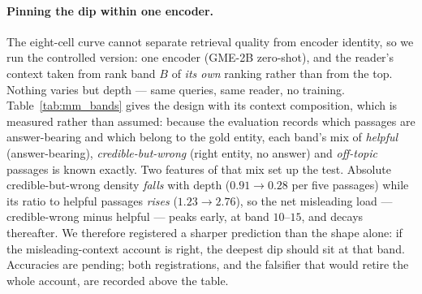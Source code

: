 %

\paragraph{Pinning the dip within one encoder.} The eight-cell curve cannot separate retrieval
quality from encoder identity, so we run the controlled version: one encoder
(\textsc{GME-2B} zero-shot), and the reader's context taken from rank band $B$ of \emph{its own}
ranking rather than from the top. Nothing varies but depth --- same queries, same reader, no
training. Table~\ref{tab:mm_bands} gives the design with its context composition, which is
measured rather than assumed: because the evaluation records which passages are answer-bearing
and which belong to the gold entity, each band's mix of \emph{helpful} (answer-bearing),
\emph{credible-but-wrong} (right entity, no answer) and \emph{off-topic} passages is known
exactly. Two features of that mix set up the test. Absolute credible-but-wrong density
\emph{falls} with depth ($0.91 \to 0.28$ per five passages) while its ratio to helpful passages
\emph{rises} ($1.23 \to 2.76$), so the net misleading load --- credible-wrong minus helpful ---
peaks early, at band $10$--$15$, and decays thereafter. We therefore registered a sharper
prediction than the shape alone: if the misleading-context account is right, the deepest dip
should sit at that band. Accuracies are pending; both registrations, and the falsifier that
would retire the whole account, are recorded above the table.

